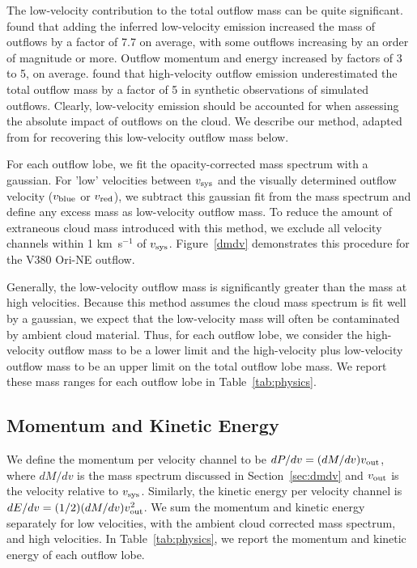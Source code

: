 \documentclass[twocolumn]{aastex62}
\newcommand{\example}{V380 Ori-NE}
\newcommand{\kms}{km~s$^{-1}$}
\begin{document}
The low-velocity contribution to the total outflow mass can be quite significant. \citet{Dunham14} found that adding the inferred low-velocity emission increased the mass of outflows by a factor of 7.7 on average, with some outflows increasing by an order of magnitude or more. Outflow momentum and energy increased by factors of 3 to 5, on average. \citet{Offner11} found that high-velocity outflow emission underestimated the total outflow mass by a factor of 5 in synthetic observations of simulated outflows. Clearly, low-velocity emission should be accounted for when assessing the absolute impact of outflows on the cloud. We describe our method, adapted from \citet{Dunham14} for recovering this low-velocity outflow mass below. 

For each outflow lobe, we fit the opacity-corrected mass spectrum with a gaussian. For 'low' velocities between $v_{\rm sys}$ and the visually determined outflow velocity ($v_{\rm blue}$ or $v_{\rm red}$), we subtract this gaussian fit from the mass spectrum and define any excess mass as low-velocity outflow mass. To reduce the amount of extraneous cloud mass introduced with this method, we exclude all velocity channels within 1 \kms{} of $v_{\rm sys}$. Figure~\ref{dmdv} demonstrates this procedure for the \example{} outflow. 

Generally, the low-velocity outflow mass is significantly greater than the mass at high velocities. Because this method assumes the cloud mass spectrum is fit well by a gaussian, we expect that the low-velocity mass will often be contaminated by ambient cloud material. Thus, for each outflow lobe, we consider the high-velocity outflow mass to be a lower limit and the high-velocity plus low-velocity outflow mass to be an upper limit on the total outflow lobe mass. We report these mass ranges for each outflow lobe in Table~\ref{tab:physics}.

\subsection{Momentum and Kinetic Energy}

We define the momentum per velocity channel to be $dP/dv = (dM/dv) v_{\rm out}$, where $dM/dv$ is the mass spectrum discussed in Section~\ref{sec:dmdv} and $v_{\rm out}$ is the velocity relative to $v_{\rm sys}$. Similarly, the kinetic energy per velocity channel is $dE/dv = (1/2) (dM/dv)  v_{\rm out}^2$. We sum the momentum and kinetic energy separately for low velocities, with the ambient cloud corrected mass spectrum, and high velocities. In Table~\ref{tab:physics}, we report the momentum and kinetic energy of each outflow lobe.
\end{document}
